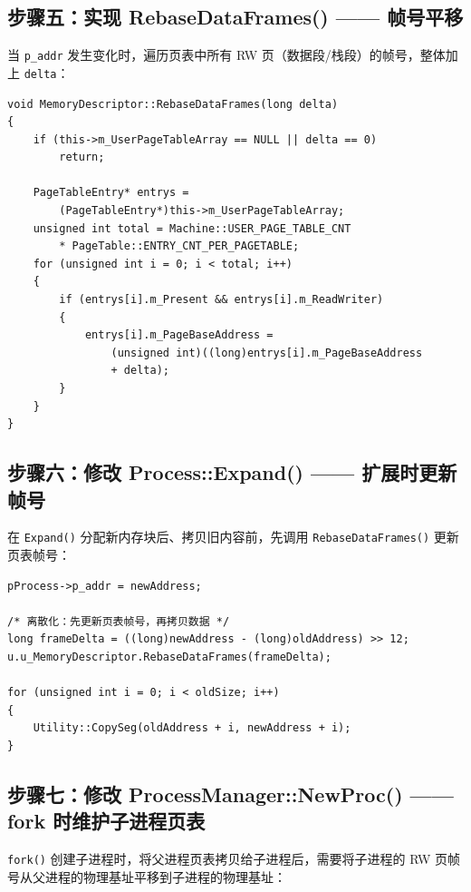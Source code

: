 \documentclass[12pt]{article}
\begin{document}
\subsection{步骤五：实现 RebaseDataFrames() —— 帧号平移}

当 \texttt{p\_addr} 发生变化时，遍历页表中所有 RW 页（数据段/栈段）的帧号，整体加上 \texttt{delta}：

\begin{lstlisting}[caption={RebaseDataFrames 实现}]
void MemoryDescriptor::RebaseDataFrames(long delta)
{
    if (this->m_UserPageTableArray == NULL || delta == 0)
        return;

    PageTableEntry* entrys =
        (PageTableEntry*)this->m_UserPageTableArray;
    unsigned int total = Machine::USER_PAGE_TABLE_CNT
        * PageTable::ENTRY_CNT_PER_PAGETABLE;
    for (unsigned int i = 0; i < total; i++)
    {
        if (entrys[i].m_Present && entrys[i].m_ReadWriter)
        {
            entrys[i].m_PageBaseAddress =
                (unsigned int)((long)entrys[i].m_PageBaseAddress
                + delta);
        }
    }
}
\end{lstlisting}

\subsection{步骤六：修改 Process::Expand() —— 扩展时更新帧号}

在 \texttt{Expand()} 分配新内存块后、拷贝旧内容前，先调用 \texttt{RebaseDataFrames()} 更新页表帧号：

\begin{lstlisting}[caption={Expand 中调用 RebaseDataFrames}]
pProcess->p_addr = newAddress;

/* 离散化：先更新页表帧号，再拷贝数据 */
long frameDelta = ((long)newAddress - (long)oldAddress) >> 12;
u.u_MemoryDescriptor.RebaseDataFrames(frameDelta);

for (unsigned int i = 0; i < oldSize; i++)
{
    Utility::CopySeg(oldAddress + i, newAddress + i);
}
\end{lstlisting}

\subsection{步骤七：修改 ProcessManager::NewProc() —— fork 时维护子进程页表}

\texttt{fork()} 创建子进程时，将父进程页表拷贝给子进程后，需要将子进程的 RW 页帧号从父进程的物理基址平移到子进程的物理基址：
\end{document}
